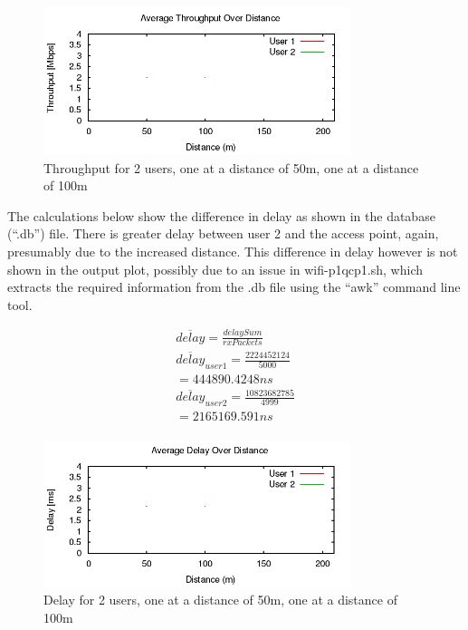 \begin{figure}[H]
	\centering
	\includegraphics[width=0.8\textwidth]{images/EE500/QC/P1/Images/wifi-throughput}
	\caption{Throughput for 2 users, one at a distance of 50m, one at a
	distance of 100m}
	\label{fig:QCP1throughput}
\end{figure}

The calculations below show the difference in delay as shown in the database
(``.db'') file. There is greater delay between user 2 and the access point,
again, presumably due to the increased distance. This difference in delay
however is not shown in the output plot, possibly due to an issue in
wifi-p1qcp1.sh, which extracts the required information from the .db file using
the ``awk'' command line tool.

\begin{gather*}
	\overline{delay}=\frac{delaySum}{rxPackets} \\
	\overline{delay}_{user 1}=\frac{2224452124}{5000} \\
	= 444890.4248ns \\
	\overline{delay}_{user 2}=\frac{10823682785}{4999} \\
	= 2165169.591ns \\
\end{gather*}

\begin{figure}[H]
	\centering
	\includegraphics[width=0.8\textwidth]{images/EE500/QC/P1/Images/wifi-delay}
	\caption{Delay for 2 users, one at a distance of 50m, one at a distance
	of 100m}
	\label{fig:QCP1delay}
\end{figure}

